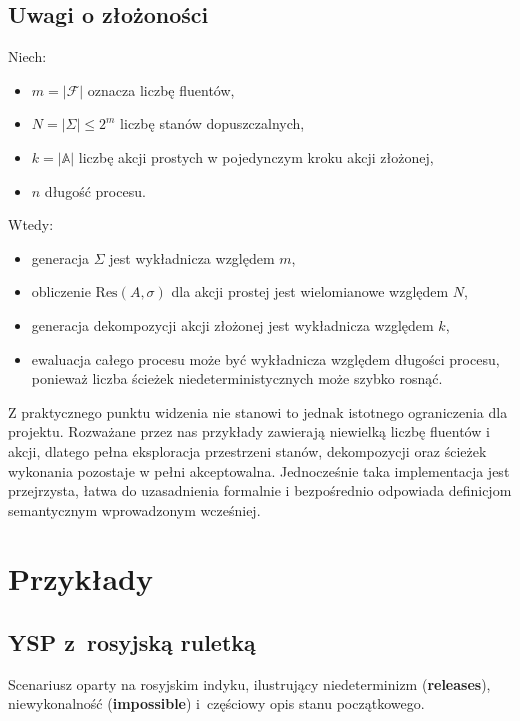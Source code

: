 \documentclass[11pt,a4paper]{article}
\newif\ifshowbib
\newcommand{\bibonly}[1]{\ifshowbib#1\fi}
\renewcommand{\cite}[2][]{\unskip}%
\newcommand{\impossible}{\textbf{impossible}}
\newcommand{\releases}{\textbf{releases}}
\theoremstyle{definition}
\begin{document}
\subsection{Uwagi o złożoności}

Niech:
\begin{itemize}
    \item $m = |\mathcal{F}|$ oznacza liczbę fluentów,
    \item $N = |\Sigma| \leq 2^m$ liczbę stanów dopuszczalnych,
    \item $k = |\mathbb{A}|$ liczbę akcji prostych w pojedynczym kroku akcji złożonej,
    \item $n$ długość procesu.
\end{itemize}

Wtedy:
\begin{itemize}
    \item generacja $\Sigma$ jest wykładnicza względem $m$,
    \item obliczenie $\mathrm{Res}(A,\sigma)$ dla akcji prostej jest wielomianowe względem $N$,
    \item generacja dekompozycji akcji złożonej jest wykładnicza względem $k$,
    \item ewaluacja całego procesu może być wykładnicza względem długości procesu, ponieważ liczba ścieżek niedeterministycznych może szybko rosnąć.
\end{itemize}

Z praktycznego punktu widzenia nie stanowi to jednak istotnego ograniczenia dla projektu. Rozważane przez nas przykłady zawierają niewielką liczbę fluentów i akcji, dlatego pełna eksploracja przestrzeni stanów, dekompozycji oraz ścieżek wykonania pozostaje w pełni akceptowalna. Jednocześnie taka implementacja jest przejrzysta, łatwa do uzasadnienia formalnie i bezpośrednio odpowiada definicjom semantycznym wprowadzonym wcześniej.

\section{Przykłady}

\subsection{YSP z~rosyjską ruletką}
\label{sec:ex-ysp}

\noindent Scenariusz oparty na rosyjskim indyku\bibonly{ (\cite{rw02})}, ilustrujący
niedeterminizm (\releases{}), niewykonalność (\impossible{})
i~częściowy opis stanu początkowego.
\end{document}
